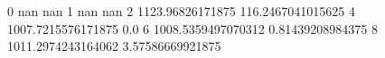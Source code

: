 0 nan nan
1 nan nan
2 1123.96826171875 116.2467041015625
4 1007.7215576171875 0.0
6 1008.5359497070312 0.81439208984375
8 1011.2974243164062 3.57586669921875
